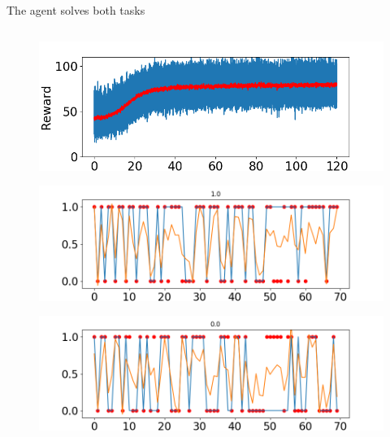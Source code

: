 \documentclass[14pt]{beamer}
\begin{document}
\begin{frame}{The agent solves both tasks}
\begin{columns}
\begin{column}{0.5\textwidth}
  \begin{figure}[htb]
    \includegraphics[width=\textwidth]{images/rtask/total_rew}
  \end{figure}
  \vspace{-0.5cm}
  \begin{figure}[htb]
    \includegraphics[width=\textwidth]{images/rtask/episode4}
  \end{figure}
  \vspace{-1cm}
  \begin{figure}[htb]
    \includegraphics[width=\textwidth]{images/rtask/episode0}
  \end{figure}
\end{column}

\end{columns}


\end{frame}
\end{document}
